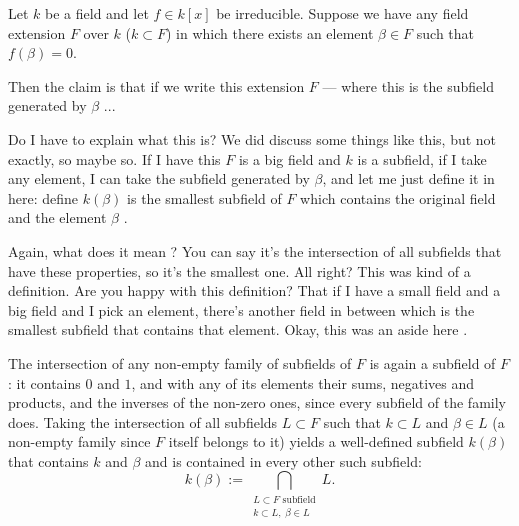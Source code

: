 \begin{content}
Let $k$ be a field and let $f \in k[x]$ be irreducible. Suppose we have any field extension $F$ over $k$ ($k \subset F$) in which there exists an element $\beta \in F$ such that $f(\beta) = 0$.
\end{content}

\begin{speech}[01:21:05 - 01:22:43]
Then the claim is that if we write this extension $F$ --- where this is the subfield generated by $\beta$ ...

Do I have to explain what this is? We did discuss some things like this, but not exactly, so maybe so. If I have this $F$ is a big field and $k$ is a subfield, if I take any element, I can take the subfield generated by $\beta$, and let me just define it in here: define $k(\beta)$ is the smallest subfield of $F$ which contains the original field and the element $\beta$ .

Again, what does it mean ? You can say it's the intersection of all subfields that have these properties, so it's the smallest one. All right? This was kind of a definition. Are you happy with this definition? That if I have a small field and a big field and I pick an element, there's another field in between which is the smallest subfield that contains that element. Okay, this was an aside here .
\end{speech}

\begin{content}

\begin{steps}
The intersection of any non-empty family of subfields of $F$ is again a subfield of $F$: it contains $0$ and $1$, and with any of its elements their sums, negatives and products, and the inverses of the non-zero ones, since every subfield of the family does. Taking the intersection of all subfields $L \subset F$ such that $k \subset L$ and $\beta \in L$ (a non-empty family since $F$ itself belongs to it) yields a well-defined subfield $k(\beta)$ that contains $k$ and $\beta$ and is contained in every other such subfield:
\[
k(\beta) := \bigcap_{\substack{L \subset F \text{ subfield} \\ k \subset L, \; \beta \in L}} L.
\]
\end{steps}
\end{content}

